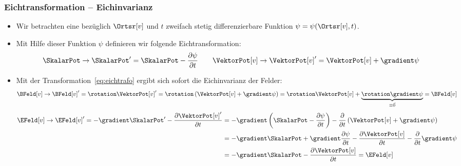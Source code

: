   \begin{frame}
  \frametitle{Eichtransformation -- Eichinvarianz}
  \begin{itemize}[<+->]
  \item Wir betrachten eine bezüglich $\Ortsr[v]$ und $t$ zweifach stetig differenzierbare Funktion $\psi = \psi(\Ortsr[v], t)$.
  \item Mit Hilfe dieser Funktion $\psi$ definieren wir folgende \alert{Eichtransformation}:
    \begin{equation}
      \SkalarPot \to \SkalarPot^\prime = \SkalarPot - \frac{\partial \psi}{\partial t} \quad\quad \VektorPot[v] \to \VektorPot[v]^\prime = \VektorPot[v] + \gradient\psi 
\label{eq:eichtrafo}
\end{equation}
\item Mit der Transformation~\eqref{eq:eichtrafo} ergibt sich sofort die \alert{Eichinvarianz} der Felder:
  \begin{equation}
    \BFeld[v] \to \BFeld[v]^\prime = \rotation \VektorPot[v]^\prime = \rotation\left( \VektorPot[v] + \gradient\psi \right) = \rotation\VektorPot[v] + \underbrace{\rotation \gradient\psi}_{\equiv \vec{0}} = \BFeld[v] 
\label{eq:EichInvB}
  \end{equation}
  \begin{equation}
    \begin{aligned}
      \EFeld[v] \to \EFeld[v]^\prime = -\gradient \SkalarPot^\prime - \frac{\partial \VektorPot[v]^\prime}{\partial t} & = -\gradient\left(\SkalarPot - \frac{\partial \psi}{\partial t}\right) - \frac{\partial }{\partial t}\left(  \VektorPot[v] + \gradient\psi\right)\\
      & = -\gradient\SkalarPot +\gradient \frac{\partial \psi}{\partial t} - \frac{\partial \VektorPot[v]}{\partial t}  - \frac{\partial }{\partial t}\gradient\psi\\
      &= -\gradient\SkalarPot - \frac{\partial \VektorPot[v]}{\partial t} = \EFeld[v]
      \end{aligned}
    \label{EichInvE}
    \end{equation}
\end{itemize}
  \end{frame}

